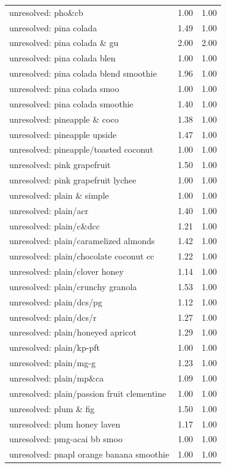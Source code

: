 \begin{table}
\begin{tabular}{lrr}
unresolved: pho\&cb & 1.00 & 1.00 \\
unresolved: pina colada & 1.49 & 1.00 \\
unresolved: pina colada \& gu & 2.00 & 2.00 \\
unresolved: pina colada blen & 1.00 & 1.00 \\
unresolved: pina colada blend smoothie & 1.96 & 1.00 \\
unresolved: pina colada smoo & 1.00 & 1.00 \\
unresolved: pina colada smoothie & 1.40 & 1.00 \\
unresolved: pineapple \& coco & 1.38 & 1.00 \\
unresolved: pineapple upside & 1.47 & 1.00 \\
unresolved: pineapple/toasted coconut & 1.00 & 1.00 \\
unresolved: pink grapefruit & 1.50 & 1.00 \\
unresolved: pink grapefruit lychee & 1.00 & 1.00 \\
unresolved: plain \& simple & 1.00 & 1.00 \\
unresolved: plain/acr & 1.40 & 1.00 \\
unresolved: plain/c\&dcc & 1.21 & 1.00 \\
unresolved: plain/caramelized almonds & 1.42 & 1.00 \\
unresolved: plain/chocolate coconut cc & 1.22 & 1.00 \\
unresolved: plain/clover honey & 1.14 & 1.00 \\
unresolved: plain/crunchy granola & 1.53 & 1.00 \\
unresolved: plain/dcs/pg & 1.12 & 1.00 \\
unresolved: plain/dcs/r & 1.27 & 1.00 \\
unresolved: plain/honeyed apricot & 1.29 & 1.00 \\
unresolved: plain/kp-pft & 1.00 & 1.00 \\
unresolved: plain/mg-g & 1.23 & 1.00 \\
unresolved: plain/mp\&ca & 1.09 & 1.00 \\
unresolved: plain/passion fruit clementine & 1.00 & 1.00 \\
unresolved: plum \& fig & 1.50 & 1.00 \\
unresolved: plum honey laven & 1.17 & 1.00 \\
unresolved: pmg-acai bb smoo & 1.00 & 1.00 \\
unresolved: pnapl orange banana smoothie & 1.00 & 1.00 \\

\end{tabular}
\end{table}
